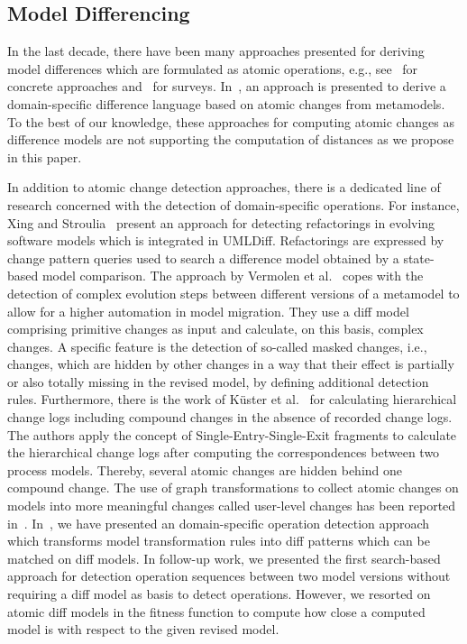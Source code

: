 \subsection{Model Differencing} 

In the last decade, there have been many approaches presented for deriving model differences which are formulated as atomic operations, e.g., see~\cite{} for concrete approaches and~\cite{} for surveys. In~\cite{}, an approach is presented to derive a domain-specific difference language based on atomic changes from metamodels. To the best of our knowledge, these approaches for computing atomic changes as difference models are not supporting the computation of distances as we propose in this paper.

In addition to atomic change detection approaches, there is a dedicated line of research concerned with the detection of domain-specific operations. For instance, Xing and Stroulia~\cite{} present an approach for detecting refactorings in evolving software models which is integrated in UMLDiff. Refactorings
are expressed by change pattern queries used to search a
difference model obtained by a state-based model comparison.
The approach by Vermolen et al.~\cite{} copes with the detection
of complex evolution steps between different versions of a
metamodel to allow for a higher automation in model
migration. They use a diff model comprising primitive changes
as input and calculate, on this basis, complex changes. A specific feature is the detection of so-called
masked changes, i.e., changes, which are hidden by other
changes in a way that their effect is partially or also totally
missing in the revised model, by defining additional detection
rules. Furthermore, there is the work of Küster et al.~\cite{} for
calculating hierarchical change logs including compound
changes in the absence of recorded change logs. The authors
apply the concept of Single-Entry-Single-Exit fragments to
calculate the hierarchical change logs after computing the
correspondences between two process models. Thereby,
several atomic changes are hidden behind one compound
change. The use of graph transformations to collect atomic
changes on models into more meaningful changes called user-level
changes has been reported in~\cite{}. In~\cite{}, we have presented an domain-specific operation detection approach which transforms model transformation rules into diff patterns which can be matched on diff models. In follow-up work, we presented the first search-based approach for detection operation sequences between two model versions without requiring a diff model as basis to detect operations. However, we resorted on atomic diff models in the fitness function to compute how close a computed model is with respect to the given revised model.


